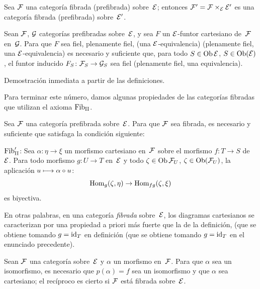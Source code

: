 \begin{corollaire}
\label{VI.6.9}
Sea $\cal{F}$ una categoría fibrada (\resp prefibrada) sobre~$\cal{E}$;
entonces $\cal{F}'=\cal{F}\times_{\cal{E}}\cal{E}'$ es una categoría
fibrada (\resp prefibrada) sobre~$\cal{E}'$.
\end{corollaire}

\begin{proposition}
\label{VI.6.10} Sean $\cal{F}$, $\cal{G}$ categorías prefibradas
sobre~$\cal{E}$, y sea $F$ un $\cal{E}$-funtor cartesiano de~$\cal{F}$
en~$\cal{G}$. Para que $F$ sea fiel,
{\resp plenamente fiel, (\resp una $\cal{E}$-equivalencia)}
{(\resp plenamente fiel, \resp una $\cal{E}$-equivalencia)}
es necesario y suficiente que, para todo
{$S\in\Ob \cal{E}$,}
{$S\in\Ob(\cal{E})$,}
el funtor inducido $F_S\colon\cal{F}_S\to\cal{G}_S$ sea fiel
(\resp plenamente fiel, \resp una equivalencia).
\end{proposition}

Demostración inmediata a partir de las definiciones.

Para terminar este número, damos algunas propiedades de las categorías
fibradas que utilizan el axioma $\Fib_{\mathrm{II}}$.
\begin{proposition}
\label{VI.6.11} Sea $\cal{F}$ una categoría prefibrada sobre~$\cal{E}$.
Para que $\cal{F}$ sea fibrada, es necesario y suficiente que satisfaga la
condición siguiente:

$\Fib_{\mathrm{II}}'$: Sea $\alpha\colon\eta\to\xi$ un morfismo
cartesiano en~$\cal{F}$ sobre el morfismo $f\colon T\to S$ de~$\cal{E}$.
Para todo morfismo $g\colon U\to T$ en~$\cal{E}$ y todo
{$\zeta\in\Ob \cal{F}_U$,}
{$\zeta\in\Ob(\cal{F}_U)$,}
la aplicación $u\mto\alpha\circ u$:
$$
\Hom_g(\zeta,\eta)\to\Hom_{fg}(\zeta,\xi)
$$
es biyectiva.
\end{proposition}

En otras palabras, en una categoría \emph{fibrada} sobre~$\cal{E}$, los
diagramas cartesianos se caracterizan por una propiedad a priori más
fuerte que la de la
{definición, (que se obtiene tomando $g=\id_T$ en}
{definición (que se obtiene tomando $g=\id_T$ en}
el enunciado precedente).
\begin{corollaire}
\label{VI.6.12} Sean $\cal{F}$ una categoría sobre~$\cal{E}$ y $\alpha$
un morfismo en~$\cal{F}$. Para que $\alpha$ sea un isomorfismo, es
necesario que $p(\alpha)=f$ sea un isomorfismo y que $\alpha$ sea
cartesiano; el recíproco es cierto si $\cal{F}$ está fibrada
sobre~$\cal{E}$.
\end{corollaire}

